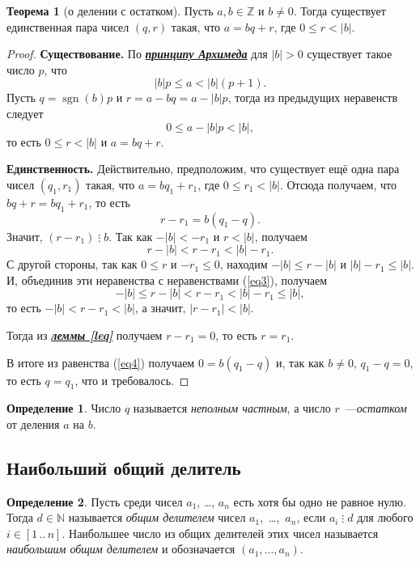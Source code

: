\documentclass[14pt, a4paper]{extarticle}
\theoremstyle{definition}
\newtheorem{theorem}{Теорема}
\newtheorem*{definition}{Определение}
\newcommand{\divisible}{\mathop{\vdots}}
\DeclareMathOperator{\sgn}{sgn}
\begin{document}
	\begin{theorem}[о делении с остатком]
	\label{ost}
		Пусть $a,b\in\mathbb{Z}$ и $b\neq0$. Тогда существует единственная пара чисел $(q,r)$ такая, что $a=bq+r$, где $0\leqslant r<|b|$.
	\end{theorem}
	\begin{proof}
		\textbf{Существование.} По \href{https://ru.wikipedia.org/wiki/%D0%90%D0%BA%D1%81%D0%B8%D0%BE%D0%BC%D0%B0_%D0%90%D1%80%D1%85%D0%B8%D0%BC%D0%B5%D0%B4%D0%B0}{\textbf{\textit{принципу Архимеда}}} для $|b|>0$ существует такое число $p$, что $$|b|p\leqslant a<|b|(p+1).$$
		Пусть $q=\sgn(b)p$ и $r=a-bq=a-|b|p$, тогда из предыдущих неравенств следует $$0\leqslant a-|b|p<|b|,$$ то есть $0\leqslant r<|b|$ и $a=bq+r$.
		
		\textbf{Единственность.} Действительно, предположим, что существует ещё одна пара чисел $(q_1,r_1)$ такая, что $a=bq_1+r_1$, где $0\leqslant r_1<|b|$. Отсюда получаем, что $bq+r=bq_1+r_1$, то есть
		\begin{equation}
		\label{eq4}
			r-r_1=b(q_1-q).
		\end{equation}
		Значит, $(r-r_1)\divisible b$. Так как $-|b|<-r_1$ и $r<|b|$, получаем
		\begin{equation}
		\label{eq3}
			r-|b|<r-r_1<|b|-r_1.
		\end{equation}
		С другой стороны, так как $0\leqslant r$ и $-r_1\leqslant0$, находим $-|b|\leqslant r-|b|$ и $|b|-r_1\leqslant |b|$. И, объединив эти неравенства с неравенствами (\ref{eq3}), получаем $$-|b|\leqslant r-|b|<r-r_1<|b|-r_1\leqslant |b|,$$ то есть $-|b|<r-r_1<|b|$, а значит, $|r-r_1|<|b|$.

		Тогда из \hyperref[leq]{\textbf{\textit{леммы \ref*{leq}}}} получаем $r-r_1=0$, то есть $r=r_1$.
		
		В итоге из равенства (\ref{eq4}) получаем $0=b(q_1-q)$ и, так как $b\neq0$, $q_1-q=0$, то есть $q=q_1$, что и требовалось.
	\end{proof}

	\begin{definition}
		Число $q$ называется \emph{неполным частным}, а число $r$~---\emph{остатком} от деления $a$ на $b$.
	\end{definition}

\subsection{Наибольший общий делитель}
\label{nod}

	\begin{definition}
		Пусть среди чисел $a_1$, \dots, $a_n$ есть хотя бы одно не равное нулю. Тогда $d\in\mathbb{N}$ называется \emph{общим делителем} чисел \mbox{$a_1$, \dots, $a_n$}, если $a_i\divisible d$ для любого $i\in[1\,..\,n]$. Наибольшее число из общих делителей этих чисел называется \emph{наибольшим общим делителем} и обозначается $(a_1,\dots,a_n)$.
	\end{definition}
\end{document}
